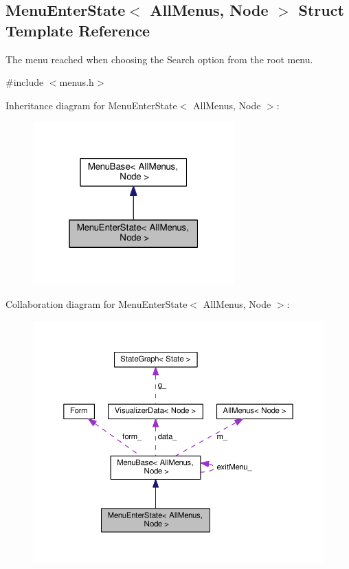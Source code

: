 \hypertarget{structMenuEnterState}{}\subsection{Menu\+Enter\+State$<$ All\+Menus, Node $>$ Struct Template Reference}
\label{structMenuEnterState}


The menu reached when choosing the Search option from the root menu.  




{\ttfamily \#include $<$menus.\+h$>$}



Inheritance diagram for Menu\+Enter\+State$<$ All\+Menus, Node $>$\+:\nopagebreak
\begin{figure}[H]
\begin{center}
\leavevmode
\includegraphics[width=220pt]{structMenuEnterState__inherit__graph}
\end{center}
\end{figure}


Collaboration diagram for Menu\+Enter\+State$<$ All\+Menus, Node $>$\+:\nopagebreak
\begin{figure}[H]
\begin{center}
\leavevmode
\includegraphics[width=350pt]{structMenuEnterState__coll__graph}
\end{center}
\end{figure}

